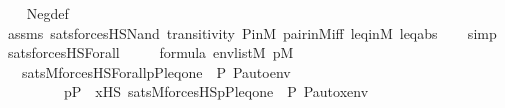 \begin{isabellebody}
%
\isadelimproof
\ \ %
\endisadelimproof
%
\isatagproof
{}\isamarkupfalse%
\ Neg{\isacharunderscore}{\kern0pt}def\isanewline
\ \ \isamarkupfalse%
\ assms\ sats{\isacharunderscore}{\kern0pt}forcesHS{\isacharunderscore}{\kern0pt}Nand{\isacharprime}{\kern0pt}\ transitivity\ P{\isacharunderscore}{\kern0pt}in{\isacharunderscore}{\kern0pt}M\ pair{\isacharunderscore}{\kern0pt}in{\isacharunderscore}{\kern0pt}M{\isacharunderscore}{\kern0pt}iff\ leq{\isacharunderscore}{\kern0pt}in{\isacharunderscore}{\kern0pt}M\ leq{\isacharunderscore}{\kern0pt}abs\isanewline
\ \ \isamarkupfalse%
\ simp%
\endisatagproof
{\isafoldproof}%
%
\isadelimproof
\isanewline
%
\endisadelimproof
\isanewline
{}\isamarkupfalse%
\ sats{\isacharunderscore}{\kern0pt}forcesHS{\isacharunderscore}{\kern0pt}Forall\ {\isacharcolon}{\kern0pt}\isanewline
\ \ \ \ {\isachardoublequoteopen}{\isasymphi}{\isasymin}formula{\isachardoublequoteclose}\ {\isachardoublequoteopen}env{\isasymin}list{\isacharparenleft}{\kern0pt}M{\isacharparenright}{\kern0pt}{\isachardoublequoteclose}\ {\isachardoublequoteopen}p{\isasymin}M{\isachardoublequoteclose}\ \ \isanewline
\ \ \ {\isachardoublequoteopen}sats{\isacharparenleft}{\kern0pt}M{\isacharcomma}{\kern0pt}forcesHS{\isacharparenleft}{\kern0pt}Forall{\isacharparenleft}{\kern0pt}{\isasymphi}{\isacharparenright}{\kern0pt}{\isacharparenright}{\kern0pt}{\isacharcomma}{\kern0pt}{\isacharbrackleft}{\kern0pt}p{\isacharcomma}{\kern0pt}P{\isacharcomma}{\kern0pt}leq{\isacharcomma}{\kern0pt}one{\isacharcomma}{\kern0pt}{\isacharless}{\kern0pt}{\isasymF}{\isacharcomma}{\kern0pt}\ {\isasymG}{\isacharcomma}{\kern0pt}\ P{\isacharcomma}{\kern0pt}\ P{\isacharunderscore}{\kern0pt}auto{\isachargreater}{\kern0pt}{\isacharbrackright}{\kern0pt}{\isacharat}{\kern0pt}env{\isacharparenright}{\kern0pt}\ {\isasymlongleftrightarrow}\isanewline
\ \ \ \ \ \ \ \ \ p{\isasymin}P\ {\isasymand}\ {\isacharparenleft}{\kern0pt}{\isasymforall}x{\isasymin}HS{\isachardot}{\kern0pt}\ sats{\isacharparenleft}{\kern0pt}M{\isacharcomma}{\kern0pt}forcesHS{\isacharprime}{\kern0pt}{\isacharparenleft}{\kern0pt}{\isasymphi}{\isacharparenright}{\kern0pt}{\isacharcomma}{\kern0pt}{\isacharbrackleft}{\kern0pt}p{\isacharcomma}{\kern0pt}P{\isacharcomma}{\kern0pt}leq{\isacharcomma}{\kern0pt}one{\isacharcomma}{\kern0pt}{\isacharless}{\kern0pt}{\isasymF}{\isacharcomma}{\kern0pt}\ {\isasymG}{\isacharcomma}{\kern0pt}\ P{\isacharcomma}{\kern0pt}\ P{\isacharunderscore}{\kern0pt}auto{\isachargreater}{\kern0pt}{\isacharcomma}{\kern0pt}x{\isacharbrackright}{\kern0pt}{\isacharat}{\kern0pt}env{\isacharparenright}{\kern0pt}{\isacharparenright}{\kern0pt}{\isachardoublequoteclose}\isanewline

\end{isabellebody}
